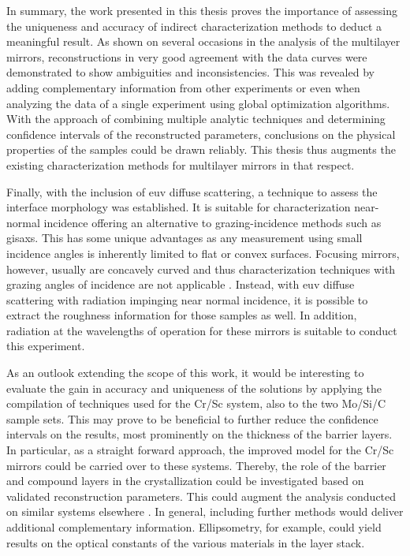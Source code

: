 In summary, the work presented in this thesis proves the importance of assessing the uniqueness and accuracy of indirect characterization methods to deduct a meaningful result. As shown on several occasions in the analysis of the multilayer mirrors, reconstructions in very good agreement with the data curves were demonstrated to show ambiguities and inconsistencies. This was revealed by adding complementary information from other experiments or even when analyzing the data of a single experiment using global optimization algorithms. With the approach of combining multiple analytic techniques and determining confidence intervals of the reconstructed parameters, conclusions on the physical properties of the samples could be drawn reliably. This thesis thus augments the existing characterization methods for multilayer mirrors in that respect.

Finally, with the inclusion of \gls{euv} diffuse scattering, a technique to assess the interface morphology was established. It is suitable for characterization near-normal incidence offering an alternative to grazing-incidence methods such as \gls{gisaxs}. This has some unique advantages as any measurement using small incidence angles is inherently limited to flat or convex surfaces. Focusing mirrors, however, usually are concavely curved and thus characterization techniques with grazing angles of incidence are not applicable . Instead, with \gls{euv} diffuse scattering with radiation impinging near normal incidence, it is possible to extract the roughness information for those samples as well. In addition, radiation at the wavelengths of operation for these mirrors is suitable to conduct this experiment.

As an outlook extending the scope of this work, it would be interesting to evaluate the gain in accuracy and uniqueness of the solutions by applying the compilation of techniques used for the Cr/Sc system, also to the two Mo/Si/C sample sets. This may prove to be beneficial to further reduce the confidence intervals on the results, most prominently on the thickness of the barrier layers. In particular, as a straight forward approach, the improved model for the Cr/Sc mirrors could be carried over to these systems. Thereby, the role of the barrier and compound layers in the crystallization could be investigated based on validated reconstruction parameters. This could augment the analysis conducted on similar systems elsewhere \cite{bajt_investigation_2001}. In general, including further methods would deliver additional complementary information. Ellipsometry, for example, could yield results on the optical constants of the various materials in the layer stack.